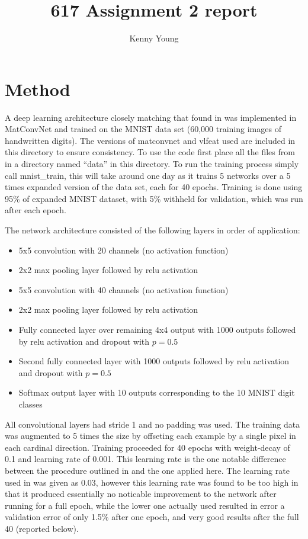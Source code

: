 \documentclass[a4paper,12pt]{article}
\title{617 Assignment 2 report}
\author{Kenny Young}
\begin{document}
\maketitle
\tableofcontents
\section{Method}
A deep learning architecture closely matching that found in \cite{SRC} was implemented in MatConvNet and trained on the MNIST data set (60,000 training images of handwritten digits). The versions of matconvnet and vlfeat used are included in this directory to ensure consistency. To use the code first place all the files from \cite{MNIST} in a directory named ``data'' in this directory. To run the training process simply call mnist\_train, this will take around one day as it trains 5 networks over a 5 times expanded version of the data set, each for 40 epochs. Training is done using 95\% of expanded MNIST dataset, with 5\% withheld for validation, which was run after each epoch.

The network architecture consisted of the following layers in order of application:
\begin{itemize}
\item 5x5 convolution with 20 channels (no activation function)
\item 2x2 max pooling layer followed by relu activation
\item 5x5 convolution with 40 channels (no activation function)
\item 2x2 max pooling layer followed by relu activation
\item Fully connected layer over remaining 4x4 output with 1000 outputs followed by relu activation and dropout with $p=0.5$
\item Second fully connected layer with 1000 outputs followed by relu activation and dropout with $p=0.5$
\item Softmax output layer with 10 outputs corresponding to the 10 MNIST digit classes
\end{itemize}

All convolutional layers had stride 1 and no padding was used. The training data was augmented to 5 times the size by offseting each example by a single pixel in each cardinal direction. Training proceeded for 40 epochs with weight-decay of 0.1 and learning rate of 0.001. This learning rate is the one notable difference between the procedure outlined in \cite{SRC} and the one applied here. The learning rate used in \cite{SRC} was given as 0.03, however this learning rate was found to be too high in that it produced essentially no noticable improvement to the network after running for a full epoch, while the lower one actually used resulted in error a validation error of only 1.5\% after one epoch, and very good results after the full 40 (reported below).
\end{document}
